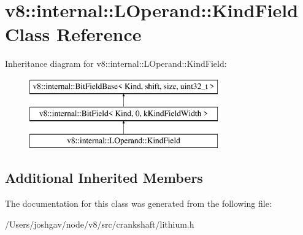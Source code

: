 \hypertarget{classv8_1_1internal_1_1_l_operand_1_1_kind_field}{}\section{v8\+:\+:internal\+:\+:L\+Operand\+:\+:Kind\+Field Class Reference}
\label{classv8_1_1internal_1_1_l_operand_1_1_kind_field}
Inheritance diagram for v8\+:\+:internal\+:\+:L\+Operand\+:\+:Kind\+Field\+:\begin{figure}[H]
\begin{center}
\leavevmode
\includegraphics[height=3.000000cm]{classv8_1_1internal_1_1_l_operand_1_1_kind_field}
\end{center}
\end{figure}
\subsection*{Additional Inherited Members}


The documentation for this class was generated from the following file\+:\begin{DoxyCompactItemize}
\item 
/\+Users/joshgav/node/v8/src/crankshaft/lithium.\+h\end{DoxyCompactItemize}
